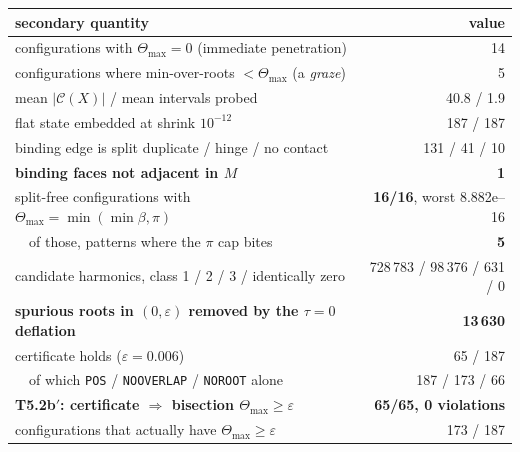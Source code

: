 \documentclass[10pt,a4paper]{article}
\begin{document}
\begin{center}\small
\begin{tabular}{@{}lr@{}}
\toprule
secondary quantity & value \\
\midrule
configurations with $\Theta_{\max} = 0$ (immediate penetration) & 14 \\
configurations where min-over-roots $<\Theta_{\max}$ (a \emph{graze}) & 5 \\
mean $|\mathcal C(X)|$ / mean intervals probed & 40.8 / 1.9 \\
flat state embedded at shrink $10^{-12}$ & 187 / 187 \\
binding edge is split duplicate / hinge / no contact & 131 / 41 / 10 \\
\textbf{binding faces not adjacent in $M$} & \textbf{1} \\
split-free configurations with $\Theta_{\max} = \min(\min\beta,\pi)$ & \textbf{16/16}, worst 8.882e--16 \\
\ \ of those, patterns where the $\pi$ cap bites & \textbf{5} \\
candidate harmonics, class 1 / 2 / 3 / identically zero & 728\,783 / 98\,376 / 631 / 0 \\
\textbf{spurious roots in $(0,\varepsilon)$ removed by the $\tau=0$ deflation} & \textbf{13\,630} \\
certificate holds ($\varepsilon = 0.006$) & 65 / 187 \\
\ \ of which \texttt{POS} / \texttt{NOOVERLAP} / \texttt{NOROOT} alone & 187 / 173 / 66 \\
\textbf{T5.2b$'$: certificate $\Rightarrow$ bisection $\Theta_{\max}\ge\varepsilon$} & \textbf{65/65, 0 violations} \\
configurations that actually have $\Theta_{\max}\ge\varepsilon$ & 173 / 187 \\
\bottomrule
\end{tabular}
\end{center}
\end{document}
